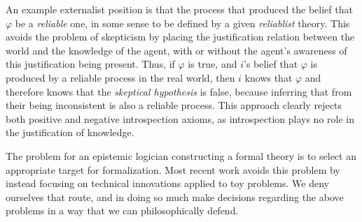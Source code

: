 An example externalist position is that the process that produced the belief that $\varphi$ be a \emph{reliable} one, in some sense to be defined by a given \emph{reliablist} theory. This avoids the problem of skepticism by placing the justification relation between the world and the knowledge of the agent, with or without the agent's awareness of this justification being present. Thus, if $\varphi$ is true, and $i$'s belief that $\varphi$ is produced by a reliable process in the real world, then $i$ knows that $\varphi$ and therefore knows that the \emph{skeptical hypothesis} is false, because inferring that from their being inconsistent is also a reliable process. This approach clearly rejects both positive and negative introspection axioms, as introspection plays no role in the justification of knowledge.

The problem for an epistemic logician constructing a formal theory is to select an appropriate target for formalization. Most recent work avoids this problem by instead focusing on technical innovations applied to toy problems. We deny ourselves that route, and in doing so much make decisions regarding the above problems in a way that we can philosophically defend.


